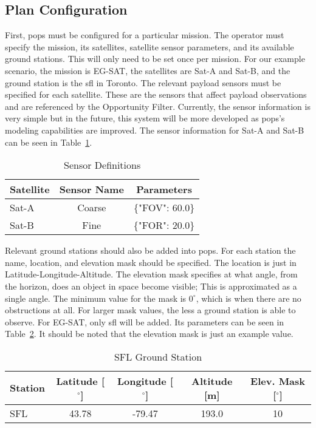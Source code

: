 \subsection{Plan Configuration}

First, \gls{pops} must be configured for a particular mission. The operator
must specify the mission, its satellites, satellite sensor parameters, and its
available ground stations. This will only need to be set once per mission. For
our example scenario, the mission is EG-SAT, the satellites are Sat-A and
Sat-B, and the ground station is the \gls{sfl} in Toronto. The relevant payload
sensors must be specified for each satellite. These are the sensors that affect
payload observations and are referenced by the Opportunity Filter. Currently,
the sensor information is very simple but in the future, this system will be
more developed as \gls{pops}'s modeling capabilities are improved. The sensor
information for Sat-A and Sat-B can be seen in Table~\ref{tab:sensors}. 

\begin{table}[h] 
    \centering
    \caption{Sensor Definitions}
    \begin{tabular}{ccc}
	Satellite                  & Sensor Name & Parameters    \\ \hline
	\multicolumn{1}{l|}{Sat-A} & Coarse      & \{"FOV": 60.0\} \\
	\multicolumn{1}{l|}{Sat-B} & Fine        & \{"FOR": 20.0\}
    \end{tabular}
    \label{tab:sensors}
\end{table}

Relevant ground stations should also be added into \gls{pops}. For each
station the name, location, and elevation mask should be specified. The
location is just in Latitude-Longitude-Altitude. The elevation mask specifies
at what angle, from the horizon, does an object in space become visible; This
is approximated as a single angle. The minimum value for the mask is $0^\circ$,
which is when there are no obstructions at all. For larger mask values, the
less a ground station is able to observe. For EG-SAT, only \gls{sfl} will be
added. Its parameters can be seen in Table~\ref{tab:ground-stations}. It should
be noted that the elevation mask is just an example value.

\begin{table}[h] 
    \centering
    \caption{SFL Ground Station}
    \begin{tabular}{ccccc}
	Station                  & Latitude [$^\circ$] & Longitude [$^\circ$] & Altitude [m] & Elev. Mask [$^\circ$] \\ \hline
	\multicolumn{1}{l|}{SFL} & 43.78   & -79.47   & 193.0  & 10      \\
    \end{tabular}
    \label{tab:ground-stations}
\end{table}

